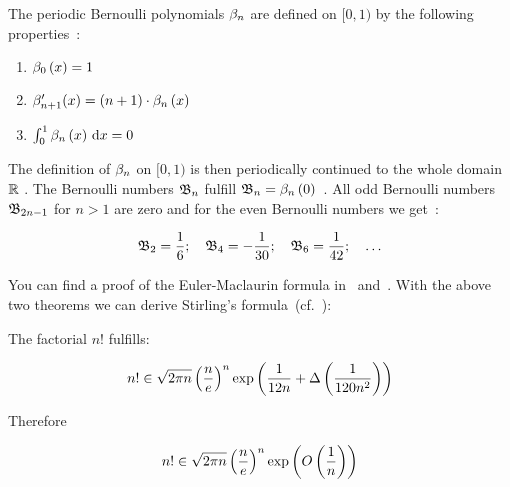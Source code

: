 The periodic Bernoulli polynomials $\bps$ are defined on $[0,1)$ by the following properties~\cite[p. 291]{koenigsberger}:

\begin{enumerate}
  \item $\bp[0]{x} = 1$
  \item $\bps[n+1]'(x) = (n+1)\cdot \bp{x}$
  \item $\int_0^1 \bp{x} \d{x} = 0$
\end{enumerate}

The definition of $\bps$ on $[0,1)$ is then periodically continued to the whole domain $\R$ . The Bernoulli numbers $\bn$ fulfill $\bn=\bp{0}$~\cite[p.~290]{koenigsberger}. All odd Bernoulli numbers $\bn[2n-1]$ for $n>1$ are zero and for the even Bernoulli numbers we get~\cite[p.~289]{koenigsberger}:

\begin{align}
  \bn[2] = \frac 16;\quad \bn[4]=-\frac{1}{30};\quad \bn[6]=\frac{1}{42};\quad \ldots
\end{align}

You can find a proof of the Euler-Maclaurin formula in~\cite[pp.~225-226]{koenigsberger} and~\cite[pp.~506-509]{heuser}. With the above two theorems we can derive Stirling's formula~(cf.~\cite[p.~228]{koenigsberger}):

\begin{theorem}
  The factorial $n!$ fulfills:

  \begin{align}
    n! \in \sqrt{2\pi n} \left(\frac ne\right)^n \fexp{\frac 1{12n} + \bigabs{\frac{1}{120n^2}} }
  \end{align}

  \noindent Therefore

  \begin{align}
     n! \in \sqrt{2\pi n} \left(\frac ne\right)^n \fexp{\bigo{\frac 1n}}
  \end{align}
\end{theorem}

